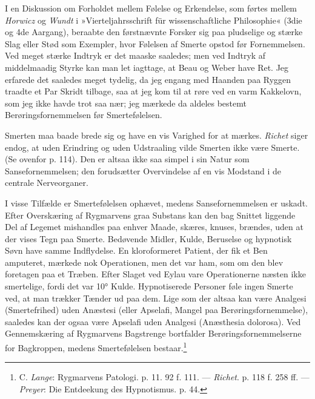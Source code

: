 \documentclass[12pt,a4paper,openany]{book}
\newcommand{\opage}[1]{\marginnote{\footnotesize\textit{[#1]}}}
\begin{document}
I en Diskussion om Forholdet mellem Følelse og Erkendelse, som førtes
mellem \emph{Horwicz} og \emph{Wundt} i »Vierteljahrsschrift für
wissenschaftliche Philosophie« (3die og 4de Aargang), beraabte den
førstnævnte Forsker sig paa pludselige og stærke Slag eller Stød som
Exempler, hvor Følelsen af Smerte opstod før Fornemmelsen. Ved meget
stærke Indtryk er det maaske saaledes; men ved Indtryk af middelmaadig
Styrke kan man let iagttage, at Beau og Weber have Ret. Jeg erfarede det
saaledes meget tydelig, da jeg engang med Haanden paa Ryggen traadte et
Par Skridt tilbage, saa at jeg kom til at røre ved en varm Kakkelovn,
som jeg ikke havde trot saa nær; jeg mærkede da aldeles bestemt
Berøringsfornemmelsen før Smertefølelsen.

Smerten maa baade brede sig og have en vis Varighed for at mærkes.
\emph{Richet} siger endog, at uden Erindring og
\opage{271}uden Udstraaling vilde Smerten ikke være Smerte. (Se ovenfor
p. 114). Den er altsaa ikke saa simpel i sin Natur som
Sansefornemmelsen; den forudsætter Overvindelse af en vis Modstand i de
centrale Nerveorganer.

I visse Tilfælde er Smertefølelsen ophævet, medens Sansefornemmelsen er
uskadt. Efter Overskæring af Rygmarvens graa Substans kan den bag
Snittet liggende Del af Legemet mishandles paa enhver Maade, skæres,
knuses, brændes, uden at der vises Tegn paa Smerte. Bedøvende Midler,
Kulde, Beruselse og hypnotisk Søvn have samme Indflydelse. En
kloroformeret Patient, der fik et Ben amputeret, mærkede nok
Operationen, men det var ham, som om den blev foretagen paa et Træben.
Efter Slaget ved Eylau vare Operationerne næsten ikke smertelige, fordi
det var 10° Kulde. Hypnotiserede Personer føle ingen Smerte ved, at man
trækker Tænder ud paa dem. Lige som der altsaa kan være Analgesi
(Smertefrihed) uden Anæstesi (eller Apselafi, Mangel paa
Berøringsfornemmelse), saaledes kan der ogsaa være Apselafi uden
Analgesi (Anæsthesia dolorosa). Ved Gennemskæring af Rygmarvens
Bagstrenge bortfalder Berøringsfornemmelserne for Bagkroppen, medens
Smertefølelsen bestaar.\footnote[1]{C. \emph{Lange}: Rygmarvens
Patologi. p. 11. 92 f. 111. --- \emph{Richet}. p. 118 f. 258 ff. ---
\emph{Preyer}: Die Entdeekung des Hypnotismus. p. 44.}
\end{document}

